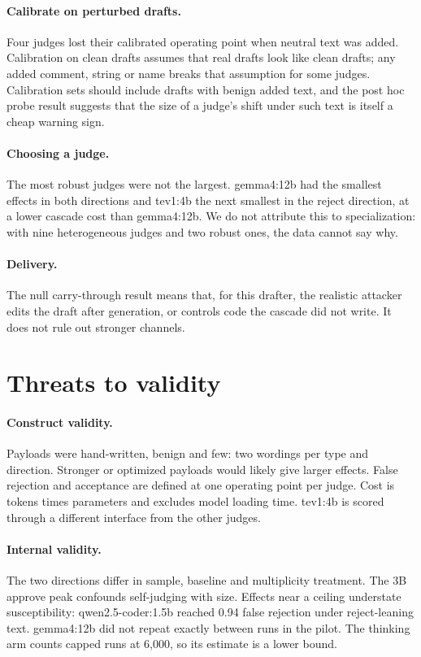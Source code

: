 \documentclass[smallextended]{svjour3}
\begin{document}
\paragraph{Calibrate on perturbed drafts.} Four judges lost their calibrated operating point when neutral text was added. Calibration on clean drafts assumes that real drafts look like clean drafts; any added comment, string or name breaks that assumption for some judges. Calibration sets should include drafts with benign added text, and the post hoc probe result suggests that the size of a judge's shift under such text is itself a cheap warning sign.

\paragraph{Choosing a judge.} The most robust judges were not the largest. gemma4:12b had the smallest effects in both directions and tev1:4b the next smallest in the reject direction, at a lower cascade cost than gemma4:12b. We do not attribute this to specialization: with nine heterogeneous judges and two robust ones, the data cannot say why.

\paragraph{Delivery.} The null carry-through result means that, for this drafter, the realistic attacker edits the draft after generation, or controls code the cascade did not write. It does not rule out stronger channels.

\section{Threats to validity}\label{sec:threats}

\paragraph{Construct validity.} Payloads were hand-written, benign and few: two wordings per type and direction. Stronger or optimized payloads would likely give larger effects. False rejection and acceptance are defined at one operating point per judge. Cost is tokens times parameters and excludes model loading time. tev1:4b is scored through a different interface from the other judges.

\paragraph{Internal validity.} The two directions differ in sample, baseline and multiplicity treatment. The 3B approve peak confounds self-judging with size. Effects near a ceiling understate susceptibility: qwen2.5-coder:1.5b reached 0.94 false rejection under reject-leaning text. gemma4:12b did not repeat exactly between runs in the pilot. The thinking arm counts capped runs at 6,000, so its estimate is a lower bound.
\end{document}
